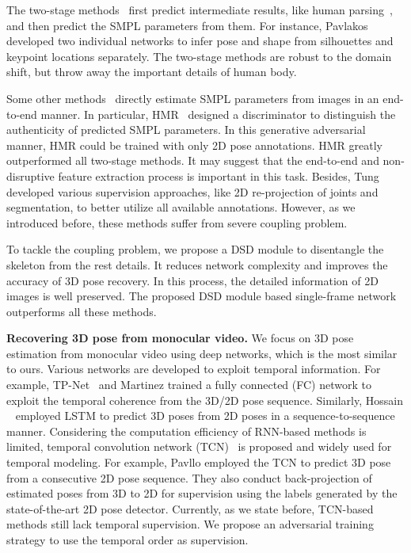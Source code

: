 \documentclass[10pt,twocolumn,letterpaper]{article}
\begin{document}
The two-stage methods~\cite{neuralbodyfitting,humanshape,unite} first predict intermediate results, like human parsing~\cite{neuralbodyfitting}, and then predict the SMPL parameters from them. For instance, Pavlakos \etal \cite{humanshape} developed two individual networks to infer pose and shape from silhouettes and keypoint locations separately. The two-stage methods are robust to the domain shift, but throw away the important details of human body.

Some other methods~\cite{hmr,self} directly estimate SMPL parameters from images in an end-to-end manner. In particular, HMR~\cite{hmr} designed a discriminator to distinguish the authenticity of predicted SMPL parameters. In this generative adversarial manner, HMR could be trained with only 2D pose annotations. HMR greatly outperformed all two-stage methods. It may suggest that the end-to-end and non-disruptive feature extraction process is important in this task. Besides, Tung~\etal~\cite{self} developed various supervision approaches, like 2D re-projection of joints and segmentation, to better utilize all available annotations. However, as we introduced before, these methods suffer from severe coupling problem.

To tackle the coupling problem, we propose a DSD module to disentangle the skeleton from the rest details. It reduces network complexity and improves the accuracy of 3D pose recovery. In this process, the detailed information of 2D images is well preserved. The proposed DSD module based single-frame network outperforms all these methods. 

\textbf{Recovering 3D pose from monocular video.} 
We focus on 3D pose estimation from monocular video using deep networks, which is the most similar to ours. Various networks are developed to exploit temporal information. For example, TP-Net~\cite{tpnet} and Martinez \etal \cite{simple} trained a fully connected (FC) network to exploit the temporal coherence from the 3D/2D pose sequence. Similarly, Hossain \etal~\cite{hossain2018exploiting} employed LSTM to predict 3D poses from 2D poses in a sequence-to-sequence manner. Considering the computation efficiency of RNN-based methods is limited, temporal convolution network (TCN)~\cite{tcn} is proposed and widely used for temporal modeling. For example, Pavllo \etal \cite{3dvideopose} employed the TCN to predict 3D pose from a consecutive 2D pose sequence. They also conduct back-projection of estimated poses from 3D to 2D for supervision using the labels generated by the state-of-the-art 2D pose detector. Currently, as we state before, TCN-based methods still lack temporal supervision. We propose an adversarial training strategy to use the temporal order as supervision.
\end{document}
